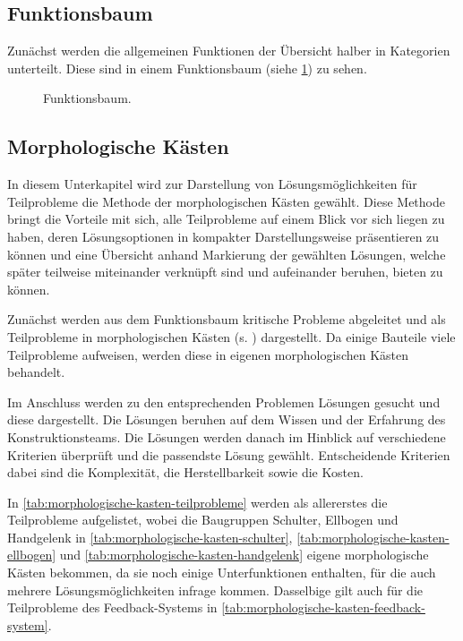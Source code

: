 		\subsection{Funktionsbaum}
			Zunächst werden die allgemeinen Funktionen der Übersicht halber in Kategorien unterteilt. Diese sind in einem Funktionsbaum (siehe \cref{fig:funktionsbaum}) zu sehen.
			
			\begin{figure}[h]
				\centering
				
				\caption[Funktionsbaum]{Funktionsbaum.}\label{fig:funktionsbaum}
			\end{figure}

		\subsection{Morphologische Kästen}
			In diesem Unterkapitel wird zur Darstellung von Lösungsmöglichkeiten für Teilprobleme die Methode der morphologischen Kästen gewählt. Diese Methode bringt die Vorteile mit sich, alle Teilprobleme auf einem Blick vor sich liegen zu haben, deren Lösungsoptionen in kompakter Darstellungsweise präsentieren zu können und eine Übersicht anhand Markierung der gewählten Lösungen, welche später teilweise miteinander verknüpft sind und aufeinander beruhen, bieten zu können.\par\medskip
			Zunächst werden aus dem Funktionsbaum kritische Probleme abgeleitet und als Teilprobleme in morphologischen Kästen (s. ) dargestellt. Da einige Bauteile viele Teilprobleme aufweisen, werden diese in eigenen morphologischen Kästen behandelt.\par
			Im Anschluss werden zu den entsprechenden Problemen Lösungen gesucht und diese dargestellt. Die Lösungen beruhen auf dem Wissen und der Erfahrung des Konstruktionsteams. Die Lösungen werden danach im Hinblick auf verschiedene Kriterien überprüft und die passendste Lösung gewählt. Entscheidende Kriterien dabei sind die Komplexität, die Herstellbarkeit sowie die Kosten.\par\medskip
			In \cref{tab:morphologische-kasten-teilprobleme} werden als allererstes die Teilprobleme aufgelistet, wobei die Baugruppen Schulter, Ellbogen und Handgelenk in \cref{tab:morphologische-kasten-schulter}, \cref{tab:morphologische-kasten-ellbogen} und \cref{tab:morphologische-kasten-handgelenk} eigene morphologische Kästen bekommen, da sie noch einige Unterfunktionen enthalten, für die auch mehrere Lösungsmöglichkeiten infrage kommen. Dasselbige gilt auch für die Teilprobleme des Feedback-Systems in \cref{tab:morphologische-kasten-feedback-system}.

